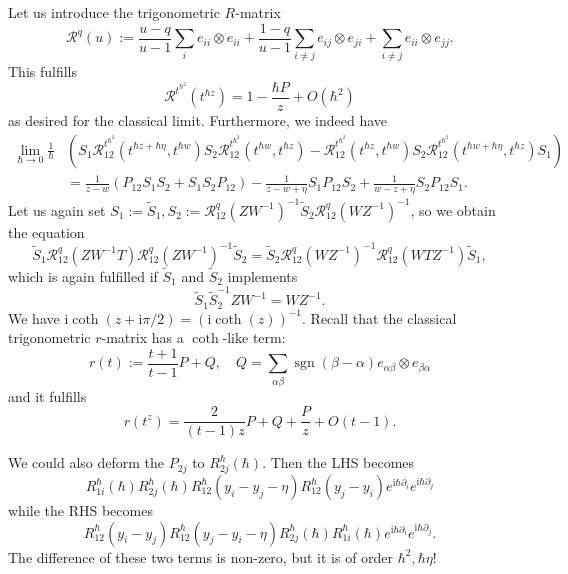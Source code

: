 \documentclass[11pt]{report}
\theoremstyle{definition}
\theoremstyle{remark}
\theoremstyle{remark}
\newcommand{\I}{\mathrm{i}}
\begin{document}
Let us introduce the trigonometric $R$-matrix
\begin{equation*}
\mathcal{R}^q(u) := \frac{u-q}{u-1} \sum_i e_{ii} \otimes e_{ii} + \frac{1-q}{u-1} \sum_{i \neq j} e_{ij} \otimes e_{ji} + \sum_{i \neq j} e_{ii} \otimes e_{jj}.
\end{equation*}
This fulfills
\begin{equation*}
\mathcal{R}^{t^{\hbar^2}}(t^{\hbar z}) = 1 - \frac{\hbar P}{z} + O(\hbar^2)
\end{equation*}
as desired for the classical limit. Furthermore, we indeed have
\begin{align*}
\lim_{\hbar \to 0} \frac{1}{\hbar} &( S_1 \mathcal{R}_{12}^{t^{\hbar^2}}(t^{\hbar z + \hbar \eta}, t^{\hbar w}) S_2 \mathcal{R}_{12}^{t^{\hbar^2}}(t^{\hbar w}, t^{\hbar z}) - \mathcal{R}_{12}^{t^{\hbar^2}}(t^{\hbar z}, t^{\hbar w}) S_2 \mathcal{R}_{12}^{t^{\hbar^2}}(t^{\hbar w + \hbar \eta}, t^{\hbar z}) S_1) \\
&= \frac{1}{z-w} (P_{12} S_1 S_2 + S_1 S_2 P_{12}) - \frac{1}{z-w+\eta} S_1 P_{12} S_2 + \frac{1}{w-z+\eta} S_2 P_{12} S_1.
\end{align*}
Let us again set $S_1 := \tilde S_1, S_2 := \mathcal{R}_{12}^q(ZW^{-1})^{-1} \tilde S_2 \mathcal{R}_{12}^q(WZ^{-1})^{-1}$, so we obtain the equation
\begin{equation*}
\tilde S_1 \mathcal{R}_{12}^q(ZW^{-1}T) \mathcal{R}_{12}^q(ZW^{-1})^{-1} \tilde S_2 = \tilde S_2 \mathcal{R}_{12}^q(WZ^{-1})^{-1} \mathcal{R}_{12}^q(WTZ^{-1}) \tilde S_1,
\end{equation*}
which is again fulfilled if $\tilde S_1$ and $\tilde S_2$ implements
\begin{equation*}
\tilde S_1 \tilde S_2^{-1} ZW^{-1} = WZ^{-1}.
\end{equation*}
We have $\I \coth(z+\I \pi/2) = (\I \coth(z))^{-1}$. Recall that the classical trigonometric $r$-matrix has a $\coth$-like term:
\begin{equation*}
r(t) := \frac{t+1}{t-1} P + Q, \quad Q = \sum_{\alpha\beta} \operatorname{sgn}(\beta-\alpha) e_{\alpha\beta} \otimes e_{\beta\alpha}
\end{equation*}
and it fulfills
\begin{equation*}
r(t^z) = \frac{2}{(t-1) z} P + Q + \frac{P}{z} + O(t-1).
\end{equation*}

We could also deform the $P_{2j}$ to $R_{2j}^\hbar(\hbar)$. Then the LHS becomes
\begin{equation*}
R_{1i}^\hbar(\hbar) R_{2j}^\hbar(\hbar) R_{12}^\hbar(y_i-y_j-\eta) R_{12}^\hbar(y_j-y_i) e^{\I\hbar \partial_i} e^{\I\hbar \partial_j}
\end{equation*}
while the RHS becomes
\begin{equation*}
R_{12}^\hbar(y_i-y_j) R_{12}^\hbar(y_j-y_i-\eta) R_{2j}^\hbar(\hbar) R_{1i}^\hbar(\hbar) e^{\I\hbar \partial_i} e^{\I\hbar \partial_j}.
\end{equation*}
The difference of these two terms is non-zero, but it is of order $\hbar^2,\hbar\eta$!
\end{document}
